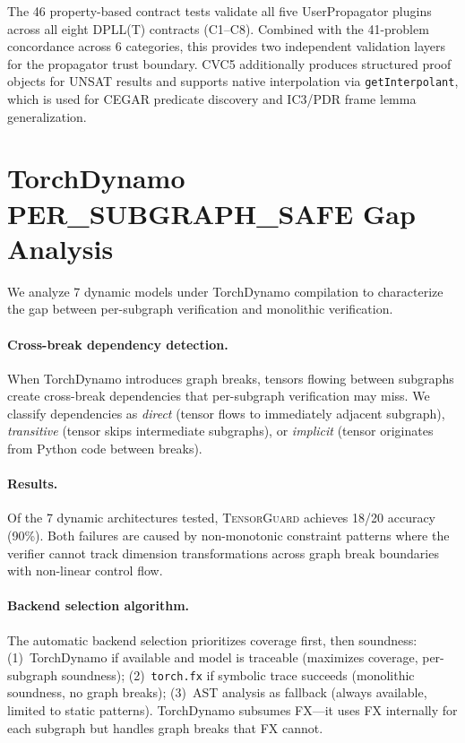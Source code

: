 \documentclass[11pt]{article}
\begin{document}
The 46 property-based contract tests validate all five UserPropagator
plugins across all eight DPLL(T) contracts (C1--C8).  Combined with
the 41-problem concordance across 6 categories, this provides two
independent validation layers for the propagator trust boundary.
CVC5 additionally produces structured proof objects for UNSAT results
and supports native interpolation via \texttt{getInterpolant}, which
is used for CEGAR predicate discovery and IC3/PDR frame lemma
generalization.


\section{TorchDynamo PER\_SUBGRAPH\_SAFE Gap Analysis}\label{app:dynamo-gap}

We analyze 7 dynamic models under TorchDynamo compilation to characterize
the gap between per-subgraph verification and monolithic verification.

\paragraph{Cross-break dependency detection.}
When TorchDynamo introduces graph breaks, tensors flowing between subgraphs
create cross-break dependencies that per-subgraph verification may miss.
We classify dependencies as \emph{direct} (tensor flows to immediately
adjacent subgraph), \emph{transitive} (tensor skips intermediate subgraphs),
or \emph{implicit} (tensor originates from Python code between breaks).

\paragraph{Results.}
Of the 7 dynamic architectures tested, \textsc{TensorGuard} achieves
18/20 accuracy (90\%).  Both failures are caused by non-monotonic
constraint patterns where the verifier cannot track dimension
transformations across graph break boundaries with non-linear control flow.

\paragraph{Backend selection algorithm.}
The automatic backend selection prioritizes coverage first, then soundness:
(1)~TorchDynamo if available and model is traceable (maximizes coverage,
per-subgraph soundness); (2)~\texttt{torch.fx} if symbolic trace
succeeds (monolithic soundness, no graph breaks); (3)~AST analysis
as fallback (always available, limited to static patterns).
TorchDynamo subsumes FX---it uses FX internally for each subgraph
but handles graph breaks that FX cannot.
\end{document}
